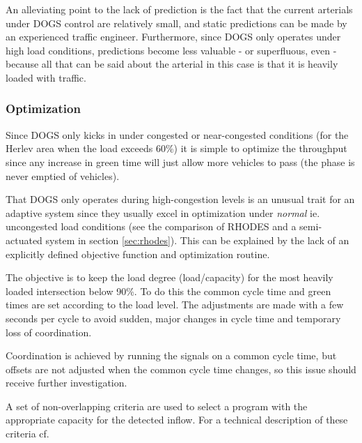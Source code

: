 An alleviating point to the lack of prediction is the fact that the
current arterials under DOGS control are relatively small, and static
predictions can be made by an experienced traffic
engineer. Furthermore, since DOGS only operates under high load
conditions, predictions become less valuable - or superfluous, even -
because all that can be said about the arterial in this case is that
it is heavily loaded with traffic.

\subsubsection*{Optimization}

Since DOGS only kicks in under congested or near-congested conditions
(for the Herlev area when the load exceeds 60\%) it is simple to
optimize the throughput since any increase in green time will just
allow more vehicles to pass (the phase is never emptied of vehicles).

That DOGS only operates during high-congestion levels is an unusual
trait for an adaptive system since they usually excel in optimization
under \textit{normal} ie. uncongested load conditions (see the
comparison of RHODES and a semi-actuated system in section
\ref{sec:rhodes}). This can be explained by the lack of an
explicitly defined objective function and optimization routine.

The objective is to keep the load degree (load/capacity) for the most
heavily loaded intersection below 90\%.  To do this the common cycle
time and green times are set according to the load level. The
adjustments are made with a few seconds per cycle to avoid sudden,
major changes in cycle time and temporary loss of coordination.

Coordination is achieved by running the signals on a common cycle
time, but offsets are not adjusted when the common cycle time changes,
so this issue should receive further investigation.

A set of non-overlapping criteria are used to select a program with
the appropriate capacity for the detected inflow. For a technical
description of these criteria cf. \cite{forprojekt}


